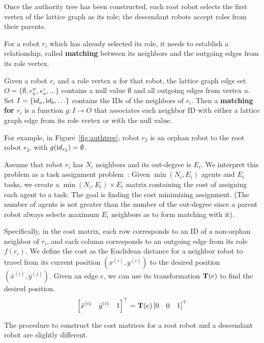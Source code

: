Once the authority tree has been constructed, each root robot selects the first vertex of the lattice graph as its role; the descendant robots accept roles from their parents.

For a robot $r_i$ which has already selected its role, it needs to establish a
relationship, called \textbf{matching} between its neighbors and the outgoing edges from its role vertex. 
\begin{defn}
\label{def:matching}
  Given a robot $r_i$ and a role vertex $u$ for that robot, the lattice
  graph edge set
    $O=\{\emptyset, e_{u}^w, e_{u}^z, \ldots\}$
  contains a null value $\emptyset$ and all outgoing edges from vertex $u$.  
  Set
    $I=\{{\textrm id}_a, {\textrm id}_b, \ldots \}$
  contains the IDs of the neighbors of $r_i$.  
  Then a
  \textbf{matching for $r_i$} is a function $g : I \rightarrow O$ that
  associates each neighbor ID with either a lattice graph edge from its role vertex or with the null value.
\end{defn}

For example, in Figure~\ref{fig:authtree}, robot $r_2$ is an orphan robot to the root robot $r_3$, with $g({\textrm id}_{r_2}) = \emptyset$.

Assume that robot $r_i$ has $N_i$ neighbors and its out-degree is $E_i$. 
%
We interpret this problem as a task assignment problem~\cite{Kuh55, Mun57}: 
Given $\min(N_i, E_i)$ agents and $E_i$ tasks, we create a $\min(N_i, E_i)\times E_i$ matrix containing the cost of assigning each agent to a task. 
%
The goal is finding the cost minimizing assignment. 
%
(The number of agents is not greater than the number of
the out-degree since a parent robot always selects maximum $E_i$ neighbors as to form matching with it).

Specifically, in the cost matrix, each row corresponds to an ID of a non-orphan neighbor of $r_i$, and each column corresponds to an outgoing edge from its role $f(r_i)$. 
%
We define the cost as the Euclidean distance for a neighbor robot to
travel from its current position $(x^{(i)}, y^{(i)})$ to the desired
position $(\bar{x}^{(i)}, \bar{y}^{(j)})$. 
%
Given an edge $e$, we can use its transformation $\mathbf{T}(e)$ to find the desired position.
\begin{equation}
  \label{eq:trans-pos}
  \left[\bar{x}^{(i)} \quad \bar{y}^{(i)} \quad 1\right]^\top = \mathbf{T}(e) \left[0 \quad 0 \quad 1\right]^\top
\end{equation}

The procedure to construct the cost matrices for a root robot and a descendant robot are slightly different.

